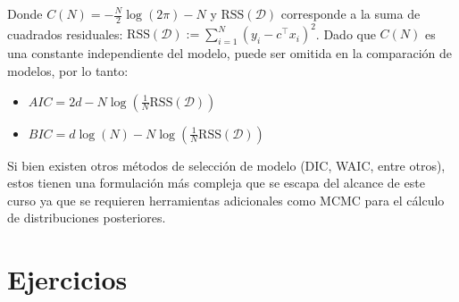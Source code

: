 Donde $C(N) = -\frac{N}{2}\log(2\pi) - N$ y $\text{RSS}(\mathcal{D})$ corresponde a la suma de cuadrados residuales: $\text{RSS}(\mathcal{D}) := \sum_{i=1}^N \left(y_i - c^\top x_i\right)^2$. Dado que $C(N)$ es una constante independiente del modelo, puede ser omitida en la comparación de modelos, por lo tanto:

\begin{itemize}
	\item $AIC=2d-N\log(\frac{1}{N}\text{RSS}(\mathcal{D}))$
	\item $BIC = d\log(N) - N\log(\frac{1}{N}\text{RSS}(\mathcal{D}))$
\end{itemize}

Si bien existen otros métodos de selección de modelo (DIC, WAIC, entre otros), estos tienen una formulación más compleja que se escapa del alcance de este curso ya que se requieren herramientas adicionales como MCMC para el cálculo de distribuciones posteriores.



\section{Ejercicios}

